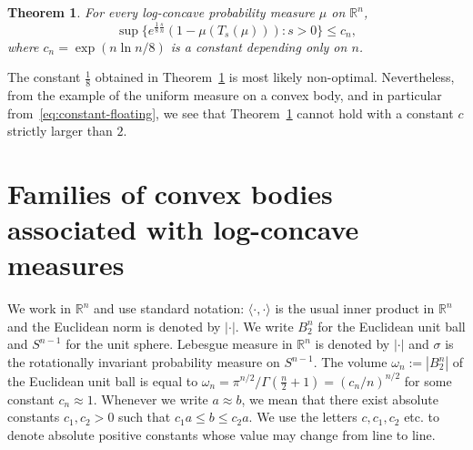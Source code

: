 \documentclass[11pt,leqno]{article}
\newtheorem{theorem}{Theorem}[section]
\theoremstyle{definition}
\theoremstyle{remark}
\numberwithin{equation}{section}
\newcommand{\ls}{\leqslant}
\newcommand{\1}{\textbf{1}}
\begin{document}
\begin{theorem}\label{th:T-measure}For every log-concave probability measure $\mu$ on $\mathbb{R}^n$,
$$\sup\{e^{\frac{1}{8}\frac{s}{n}}(1-\mu(T_s(\mu))):s>0\}\ls c_n,$$
where $c_n=\exp(n\ln n/8)$ is a constant depending only on $n$.
\end{theorem}

The constant $\tfrac{1}{8}$ obtained in Theorem~\ref{th:T-measure} is most likely non-optimal. Nevertheless, from the example 
of the uniform measure on a convex body, and in particular from~\eqref{eq:constant-floating}, we see that
Theorem~\ref{th:T-measure} cannot hold with a constant $c$ strictly larger than $2$.




\section{Families of convex bodies associated with log-concave measures}\label{section-2}

We work in $\mathbb{R}^n$ and use standard notation: $\langle\cdot ,\cdot\rangle $ is the usual inner product in ${\mathbb R}^n$
and the Euclidean norm is denoted by $|\cdot |$. We write $B_2^n$ for the Euclidean unit ball and $S^{n-1}$ for the unit sphere. Lebesgue measure in ${\mathbb R}^n$ is denoted by $|\cdot |$ and $\sigma $ is the rotationally invariant probability measure on $S^{n-1}$. The volume $\omega_n:=|B_2^n|$ of the Euclidean unit ball is equal to $\omega_n=\pi^{n/2}/\Gamma\left(\frac{n}{2}+1\right)=(c_n/n)^{n/2}$ for
some constant $c_n\approx 1$. Whenever we write $a\approx b$, we mean that there exist absolute constants $c_1,c_2>0$ such that $c_1a\ls b\ls c_2a$. We use the letters $c,c_1,c_2$ etc. to denote absolute positive
constants whose value may change from line to line.
\end{document}
